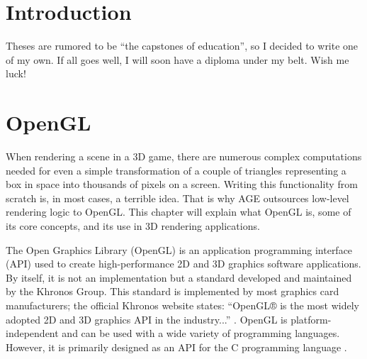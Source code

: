 \documentclass[
  digital,     %
  oneside,     %
  nosansbold,  %
  nocolorbold, %
  lof,         %
  lot,         %
]{fithesis4}
\begin{document}
\setlength{\parskip}{8pt}
\setlength{\parindent}{0pt}

\chapter*{Introduction}

Theses are rumored to be \enquote{the capstones of education}, so
I decided to write one of my own. If all goes well, I will soon
have a diploma under my belt. Wish me luck!

\chapter{OpenGL}
When rendering a scene in a 3D game, there are numerous complex computations needed for even a simple transformation
of a couple of triangles representing a box in space into thousands of pixels on a screen.
Writing this functionality from scratch is, in most cases, a terrible idea. That is why AGE outsources low-level
rendering logic to OpenGL. This chapter will explain what OpenGL is, some of its core concepts,
and its use in 3D rendering applications.

The Open Graphics Library (OpenGL) is an application programming interface (API) used to create
high-performance 2D and 3D graphics software applications. By itself, it is not an implementation
but a standard developed and maintained by the Khronos Group. This standard is implemented by
most graphics card manufacturers; the official Khronos website states: \enquote{OpenGL® is the most widely
adopted 2D and 3D graphics API in the industry...} \cite{khronos}. OpenGL is platform-independent and can be
used with a wide variety of programming languages. However, it is primarily designed as an API for
the C programming language \cite{khronos}\cite{learnopengl}.
\end{document}

